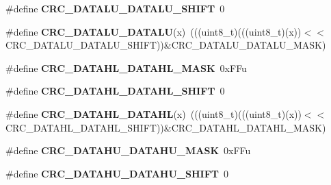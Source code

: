 \begin{DoxyCompactItemize}
\item 
\#define {\bfseries C\+R\+C\+\_\+\+D\+A\+T\+A\+L\+U\+\_\+\+D\+A\+T\+A\+L\+U\+\_\+\+S\+H\+I\+FT}~0\hypertarget{group__CRC__Register__Masks_gadb699078287075d9c73c0ececa7c11c4}{}\label{group__CRC__Register__Masks_gadb699078287075d9c73c0ececa7c11c4}

\item 
\#define {\bfseries C\+R\+C\+\_\+\+D\+A\+T\+A\+L\+U\+\_\+\+D\+A\+T\+A\+LU}(x)~(((uint8\+\_\+t)(((uint8\+\_\+t)(x))$<$$<$C\+R\+C\+\_\+\+D\+A\+T\+A\+L\+U\+\_\+\+D\+A\+T\+A\+L\+U\+\_\+\+S\+H\+I\+FT))\&C\+R\+C\+\_\+\+D\+A\+T\+A\+L\+U\+\_\+\+D\+A\+T\+A\+L\+U\+\_\+\+M\+A\+SK)\hypertarget{group__CRC__Register__Masks_ga262be66a69987ce042fd0519e27dd682}{}\label{group__CRC__Register__Masks_ga262be66a69987ce042fd0519e27dd682}

\item 
\#define {\bfseries C\+R\+C\+\_\+\+D\+A\+T\+A\+H\+L\+\_\+\+D\+A\+T\+A\+H\+L\+\_\+\+M\+A\+SK}~0x\+F\+Fu\hypertarget{group__CRC__Register__Masks_ga7774128f4d39b06d75e221d7c058f60e}{}\label{group__CRC__Register__Masks_ga7774128f4d39b06d75e221d7c058f60e}

\item 
\#define {\bfseries C\+R\+C\+\_\+\+D\+A\+T\+A\+H\+L\+\_\+\+D\+A\+T\+A\+H\+L\+\_\+\+S\+H\+I\+FT}~0\hypertarget{group__CRC__Register__Masks_ga76f45a4ca9734a414f5e73deb79ead0e}{}\label{group__CRC__Register__Masks_ga76f45a4ca9734a414f5e73deb79ead0e}

\item 
\#define {\bfseries C\+R\+C\+\_\+\+D\+A\+T\+A\+H\+L\+\_\+\+D\+A\+T\+A\+HL}(x)~(((uint8\+\_\+t)(((uint8\+\_\+t)(x))$<$$<$C\+R\+C\+\_\+\+D\+A\+T\+A\+H\+L\+\_\+\+D\+A\+T\+A\+H\+L\+\_\+\+S\+H\+I\+FT))\&C\+R\+C\+\_\+\+D\+A\+T\+A\+H\+L\+\_\+\+D\+A\+T\+A\+H\+L\+\_\+\+M\+A\+SK)\hypertarget{group__CRC__Register__Masks_ga55870105cff064737819f25ba302f07e}{}\label{group__CRC__Register__Masks_ga55870105cff064737819f25ba302f07e}

\item 
\#define {\bfseries C\+R\+C\+\_\+\+D\+A\+T\+A\+H\+U\+\_\+\+D\+A\+T\+A\+H\+U\+\_\+\+M\+A\+SK}~0x\+F\+Fu\hypertarget{group__CRC__Register__Masks_ga1dadbb252b94eae6d58efd4955a57eb2}{}\label{group__CRC__Register__Masks_ga1dadbb252b94eae6d58efd4955a57eb2}

\item 
\#define {\bfseries C\+R\+C\+\_\+\+D\+A\+T\+A\+H\+U\+\_\+\+D\+A\+T\+A\+H\+U\+\_\+\+S\+H\+I\+FT}~0\hypertarget{group__CRC__Register__Masks_ga171e0d5a315574e858cf58e22957f131}{}\label{group__CRC__Register__Masks_ga171e0d5a315574e858cf58e22957f131}


\end{DoxyCompactItemize}
